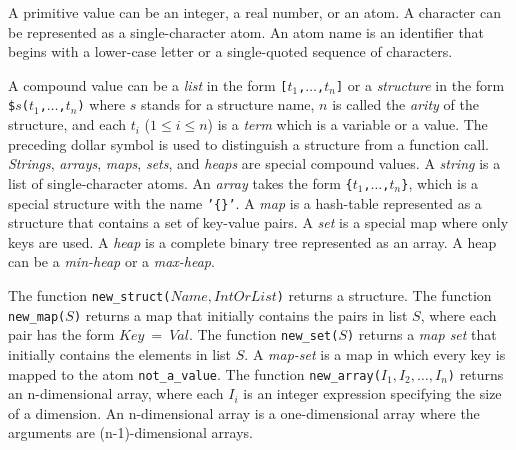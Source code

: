 A primitive value can be an integer, a real number, or an atom. A character can be represented as a single-character atom.  An atom name is an identifier that begins with a lower-case letter or a single-quoted sequence of characters. 

A compound value can be a \emph{list} in the form \texttt{[$t_1$,$\ldots$,$t_{n}$]} or a \emph{structure} in the form \texttt{\$$s$($t_1$,$\ldots$,$t_{n}$)} where $s$ stands for a structure name, $n$ is called the \emph{arity} of the structure, and each $t_i$ ($1\le i \le n$) is a \emph{term} which is a variable or a value. The preceding dollar symbol is used to distinguish a structure from a function call. \emph{Strings}, \emph{arrays}, \emph{maps}, \emph{sets}, and \emph{heaps} are special compound values. A \emph{string} is a list of single-character atoms. An \emph{array} takes the form \texttt{\{$t_1$,$\ldots$,$t_{n}$\}}, which is a special structure with the name \texttt{'\{\}'}. A \emph{map} is a hash-table represented as a structure that contains a set of key-value pairs. A \emph{set} is a special map where only keys are used.  A \emph{heap} is a complete binary tree represented as an array. A heap can be a \emph{min-heap} or a \emph{max-heap}.

The function \texttt{new\_struct($Name,IntOrList$)} returns a structure. The function \texttt{new\_map($S$)} returns a map that initially contains the pairs in list $S$, where each pair has the form $Key\ =\ Val$. The function \texttt{new\_set($S$)} returns a \emph{map set} that initially contains the elements in list $S$. A \emph{map-set}  is a map in which every key is mapped to the atom \texttt{not\_a\_value}. The function \texttt{new\_array($I_1,I_2,\ldots,I_{n}$)} returns an n-dimensional array, where each $I_i$ is an integer expression specifying the size of a dimension. An n-dimensional array is a one-dimensional array where the arguments are (n-1)-dimensional arrays. 

